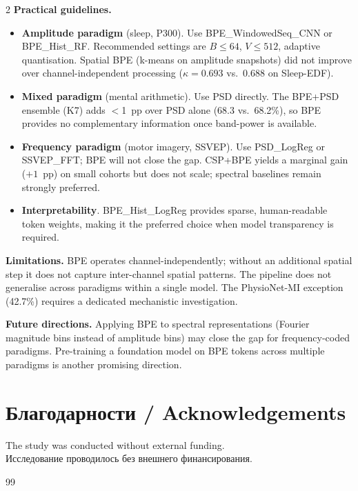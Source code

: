 \documentclass[14pt,a4paper]{extarticle}
\newcommand{\cyrtext}[1]{{\fontencoding{T2A}\selectfont #1}}
\begin{document}
\begin{multicols}{2}
\textbf{Practical guidelines.}
\begin{itemize}[leftmargin=*,itemsep=2pt]
  \item \textbf{Amplitude paradigm} (sleep, P300).
    Use BPE\_WindowedSeq\_CNN or BPE\_Hist\_RF.
    Recommended settings are $B{\leq}64$, $V{\leq}512$,
    adaptive quantisation.
    Spatial BPE (k-means on amplitude snapshots)
    did not improve over channel-independent processing
    ($\kappa{=}0.693$ vs.\ $0.688$ on Sleep-EDF).
  \item \textbf{Mixed paradigm} (mental arithmetic).
    Use PSD directly. The BPE+PSD ensemble (K7) adds $<$1~pp
    over PSD alone (68.3 vs.\ 68.2\%), so BPE provides no
    complementary information once band-power is available.
  \item \textbf{Frequency paradigm} (motor imagery, SSVEP).
    Use PSD\_LogReg or SSVEP\_FFT; BPE will not close the gap.
    CSP+BPE yields a marginal gain ($+1$~pp) on small cohorts
    but does not scale; spectral baselines remain strongly preferred.
  \item \textbf{Interpretability}. BPE\_Hist\_Log\-Reg provides
    sparse, human-readable token weights, making it the preferred
    choice when model transparency is required.
\end{itemize}

\textbf{Limitations.}
BPE operates channel-independently; without an additional spatial
step it does not capture inter-channel spatial patterns.
The pipeline does not generalise across paradigms within a single model.
The PhysioNet-MI exception (42.7\%) requires a dedicated mechanistic
investigation.

\textbf{Future directions.}
Applying BPE to spectral representations (Fourier magnitude bins
instead of amplitude bins) may close the gap for frequency-coded
paradigms.
Pre-training a foundation model on BPE tokens across multiple
paradigms is another promising direction.

\section*{\cyrtext{Благодарности} / Acknowledgements}

The study was conducted without external funding.\\
\cyrtext{Исследование проводилось без внешнего финансирования.}

\begin{thebibliography}{99}
\sloppy\raggedright


\end{thebibliography}
\end{multicols}
\end{document}
